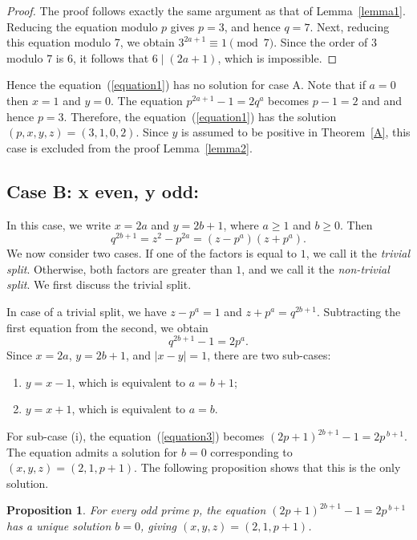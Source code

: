 \documentclass[reqno,12pt]{amsart}
\newtheorem{proposition}[theorem]{Proposition}
\theoremstyle{definition}
\begin{document}
\begin{proof}
The proof follows exactly the same argument as that of Lemma~\ref{lemma1}. Reducing the equation modulo $p$ gives $p=3$, and hence $q=7$. 
Next, reducing this equation modulo 7, we obtain $3^{2a+1}\equiv1\pmod7$. Since the order of $3$ modulo $7$ is $6$, it follows that $6\mid(2a+1)$, which is impossible.     
\end{proof}
Hence the equation~(\ref{equation1}) has no solution for case A. Note that if $a=0$ then $x=1$ and $y=0$. 
The equation $ p^{2a+1}-1=2q^a$ becomes $p-1=2$ and and hence $p=3$. 
Therefore, the  equation~(\ref{equation1})  has the solution $(p,x,y,z)=(3,1,0,2)$. Since $y$ is assumed to be positive in Theorem~\ref{A}, this case is excluded from the proof Lemma~\ref{lemma2}.

\subsection{Case B: x even, y odd:} In this case, we write $x=2a$ and $y=2b+1$, where $a \ge1 $ and $b \ge 0$.  Then
\begin{equation*}
q^{2b+1} = z^2-p^{2a} = (z-p^a)(z+p^a).    
\end{equation*}
We now consider two cases. If one of the factors is equal to $1$, we call it the \emph{trivial split}. 
Otherwise, both factors are greater than $1$, and we call it the \emph{non-trivial split}. We first discuss the trivial split.

In case of a trivial split, we have $z-p^a=1$ and $z+p^a=q^{2b+1}$. Subtracting the first equation from the second, we obtain 
\begin{equation} \label{equation3}
 q^{2b+1}-1=2p^a.   
\end{equation}
Since $x=2a$, $y=2b+1$, and $|x-y|=1$, there are two sub-cases:
\begin{enumerate}
\item[(i)] $y=x-1$, which is equivalent to $a=b+1$;
\item[(ii)] $y=x+1$, which is equivalent to $a=b$.
\end{enumerate}
For sub-case (i), the equation~(\ref{equation3}) becomes $(2p+1)^{2b+1}-1=2p^{\,b+1}$. The equation admits a solution for $b=0$ corresponding to $(x,y,z)=(2,1,p+1)$. The following proposition shows that this is the only solution.  
\begin{proposition}\label{P2.5}
\normalfont For every odd prime $p$, the equation $(2p+1)^{2b+1}-1=2p^{\,b+1}$
has a unique solution $b=0$,  giving $(x,y,z)=(2,1,p+1)$.
\end{proposition}
\end{document}
